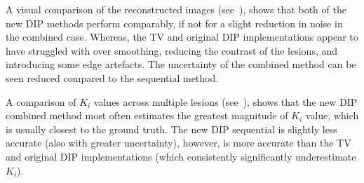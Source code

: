         
        
    
    A visual comparison of the reconstructed images (see~), shows that both of the new \gls{DIP} methods perform comparably, if not for a slight reduction in noise in the combined case. Whereas, the \gls{TV} and original \gls{DIP} implementations appear to have struggled with over smoothing, reducing the contrast of the lesions, and introducing some edge artefacts. The uncertainty of the combined method can be seen reduced compared to the sequential method.
    
    A comparison of $K_i$ values across multiple lesions (see~), shows that the new \gls{DIP} combined method most often estimates the greatest magnitude of $K_i$ value, which is usually closest to the ground truth. The new \gls{DIP} sequential is slightly less accurate (also with greater uncertainty), however, is more accurate than the \gls{TV} and original \gls{DIP} implementations (which consistently significantly underestimate $K_i$).
    
